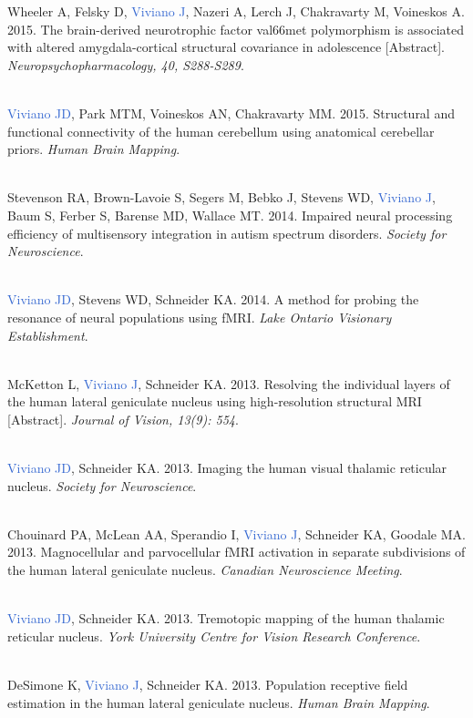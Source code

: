 \documentclass[a4paper,11pt,oneside]{book}
\begin{document}
\begin{flushleft}
Wheeler A, Felsky D, \textcolor{highlight}{Viviano J}, Nazeri A, Lerch J, Chakravarty M, Voineskos A. 2015. The brain-derived neurotrophic factor val66met polymorphism is associated with altered amygdala-cortical structural covariance in adolescence [Abstract]. \textit{Neuropsychopharmacology, 40, S288-S289}. \\\

\textcolor{highlight}{Viviano JD}, Park MTM, Voineskos AN, Chakravarty MM. 2015. Structural and functional connectivity of the human cerebellum using anatomical cerebellar priors. \textit{Human Brain Mapping}. \\\

Stevenson RA, Brown-Lavoie S, Segers M, Bebko J, Stevens WD, \textcolor{highlight}{Viviano J}, Baum S, Ferber S, Barense MD, Wallace MT. 2014. Impaired neural processing efficiency of multisensory integration in autism spectrum disorders. \textit{Society for Neuroscience}. \\\

\textcolor{highlight}{Viviano JD}, Stevens WD, Schneider KA. 2014. A method for probing the resonance of neural populations using fMRI. \textit{Lake Ontario Visionary Establishment}. \\\

McKetton L, \textcolor{highlight}{Viviano J}, Schneider KA. 2013. Resolving the individual layers of the human lateral geniculate nucleus using high-resolution structural MRI [Abstract]. \textit{Journal of Vision, 13(9): 554}. \\\

\textcolor{highlight}{Viviano JD}, Schneider KA. 2013. Imaging the human visual thalamic reticular nucleus. \textit{Society for Neuroscience}. \\\

Chouinard PA, McLean AA, Sperandio I, \textcolor{highlight}{Viviano J}, Schneider KA, Goodale MA. 2013. Magnocellular and parvocellular fMRI activation in separate subdivisions of the human lateral geniculate nucleus. \textit{Canadian Neuroscience Meeting}. \\\

\textcolor{highlight}{Viviano JD}, Schneider KA. 2013. Tremotopic mapping of the human thalamic reticular nucleus. \textit{York University Centre for Vision Research Conference}. \\\

DeSimone K, \textcolor{highlight}{Viviano J}, Schneider KA. 2013. Population receptive field estimation in the human lateral geniculate nucleus. \textit{Human Brain Mapping}. \\\


\end{flushleft}
\end{document}
